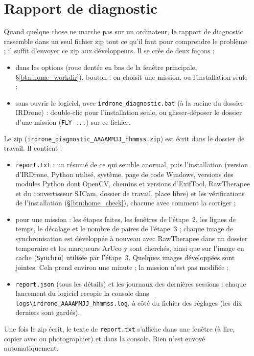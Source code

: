 \documentclass[a4paper,11pt]{report}
\DeclareRobustCommand{\bouton}[1]{\texorpdfstring{\fbox{\small\textsf{#1}}}{#1}}
\begin{document}
\section{Rapport de diagnostic}\label{btn:home_diagnostic}
Quand quelque chose ne marche pas sur un ordinateur, le rapport de diagnostic rassemble dans un seul fichier zip tout ce qu'il faut pour comprendre le problème ; il suffit d'envoyer ce zip aux développeurs. Il se crée de deux façons :
\begin{itemize}
  \item dans les options (roue dentée \bouton{⚙} en bas de la fenêtre principale, §\ref{btn:home_workdir}), bouton \bouton{Create a diagnostic report…} : on choisit une mission, ou l'installation seule ;
  \item sans ouvrir le logiciel, avec \texttt{irdrone\_diagnostic.bat} (à la racine du dossier IRDrone) : double-clic pour l'installation seule, ou glisser-déposer le dossier d'une mission (\texttt{FLY-...}) sur ce fichier.
\end{itemize}
Le zip (\texttt{irdrone\_diagnostic\_AAAAMMJJ\_hhmmss.zip}) est écrit dans le dossier de travail. Il contient :
\begin{itemize}
  \item \texttt{report.txt} : un résumé de ce qui semble anormal, puis l'installation (version d'IRDrone, Python utilisé, système, page de code Windows, versions des modules Python dont OpenCV, chemins et versions d'ExifTool, RawTherapee et du convertisseur SJCam, dossier de travail, place libre) et les vérifications de l'installation (§\ref{btn:home_check}), chacune avec comment la corriger ;
  \item pour une mission : les étapes faites, les fenêtres de l'étape~2, les lignes de temps, le décalage et le nombre de paires de l'étape~3 ; chaque image de synchronisation est développée à nouveau avec RawTherapee dans un dossier temporaire et les marqueurs ArUco y sont cherchés, ainsi que sur l'image en cache (\texttt{Synchro}) utilisée par l'étape~3. Quelques images développées sont jointes. Cela prend environ une minute ; la mission n'est pas modifiée ;
  \item \texttt{report.json} (tous les détails) et les journaux des dernières sessions : chaque lancement du logiciel recopie la console dans \texttt{logs\textbackslash irdrone\_AAAAMMJJ\_hhmmss.log}, à côté du fichier des réglages (les dix derniers sont gardés).
\end{itemize}
Une fois le zip écrit, le texte de \texttt{report.txt} s'affiche dans une fenêtre (à lire, copier avec \bouton{Copy the text} ou photographier) et dans la console. Rien n'est envoyé automatiquement.
\end{document}
